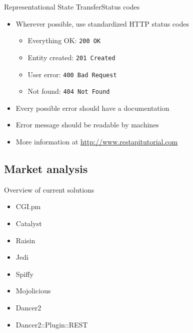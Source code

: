 
\begin{frame}{Representational State Transfer}{Status codes}
    \begin{itemize}
        \pause
        \item Wherever possible, use standardized HTTP status codes
        \pause
        \begin{itemize}
            \item Everything OK: \texttt{200 OK}
            \pause
            \item Entity created: \texttt{201 Created}
            \pause
            \item User error: \texttt{400 Bad Request}
            \pause
            \item Not found: \texttt{404 Not Found}
            \pause
        \end{itemize}
        \item Every possible error should have a documentation
        \pause
        \item Error message should be readable by machines
        \pause
        \item More information at \url{http://www.restapitutorial.com}\cite{restapitutorial}
    \end{itemize}
\end{frame}


\subsection{Market analysis}


\begin{frame}{Overview of current solutions}
    \begin{itemize}
        \pause
        \item CGI.pm
        \pause
        \item Catalyst
        \pause
        \item Raisin
        \pause
        \item Jedi
        \pause
        \item Spiffy
        \pause
        \item Mojolicious
        \pause
        \item Dancer2
        \pause
        \item Dancer2::Plugin::REST
    \end{itemize}
\end{frame}

